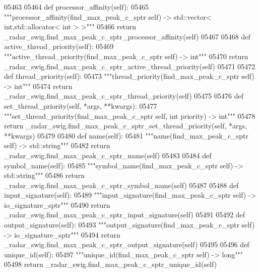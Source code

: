 \begin{DoxyCode}
{{{{{{{{{{{{{{{{{{05463 
05464     \textcolor{keyword}{def }processor_affinity(self):
05465         \textcolor{stringliteral}{"""processor\_affinity(find\_max\_peak\_c\_sptr self) -> std::vector< int,std::allocator< int > >"""}
05466         \textcolor{keywordflow}{return} \_radar\_swig.find\_max\_peak\_c\_sptr\_processor\_affinity(self)
05467 
05468     \textcolor{keyword}{def }active_thread_priority(self):
05469         \textcolor{stringliteral}{"""active\_thread\_priority(find\_max\_peak\_c\_sptr self) -> int"""}
05470         \textcolor{keywordflow}{return} \_radar\_swig.find\_max\_peak\_c\_sptr\_active\_thread\_priority(self)
05471 
05472     \textcolor{keyword}{def }thread_priority(self):
05473         \textcolor{stringliteral}{"""thread\_priority(find\_max\_peak\_c\_sptr self) -> int"""}
05474         \textcolor{keywordflow}{return} \_radar\_swig.find\_max\_peak\_c\_sptr\_thread\_priority(self)
05475 
05476     \textcolor{keyword}{def }set_thread_priority(self, *args, **kwargs):
05477         \textcolor{stringliteral}{"""set\_thread\_priority(find\_max\_peak\_c\_sptr self, int priority) -> int"""}
05478         \textcolor{keywordflow}{return} \_radar\_swig.find\_max\_peak\_c\_sptr\_set\_thread\_priority(self, *args, **kwargs)
05479 
05480     \textcolor{keyword}{def }name(self):
05481         \textcolor{stringliteral}{"""name(find\_max\_peak\_c\_sptr self) -> std::string"""}
05482         \textcolor{keywordflow}{return} \_radar\_swig.find\_max\_peak\_c\_sptr\_name(self)
05483 
05484     \textcolor{keyword}{def }symbol_name(self):
05485         \textcolor{stringliteral}{"""symbol\_name(find\_max\_peak\_c\_sptr self) -> std::string"""}
05486         \textcolor{keywordflow}{return} \_radar\_swig.find\_max\_peak\_c\_sptr\_symbol\_name(self)
05487 
05488     \textcolor{keyword}{def }input_signature(self):
05489         \textcolor{stringliteral}{"""input\_signature(find\_max\_peak\_c\_sptr self) -> io\_signature\_sptr"""}
05490         \textcolor{keywordflow}{return} \_radar\_swig.find\_max\_peak\_c\_sptr\_input\_signature(self)
05491 
05492     \textcolor{keyword}{def }output_signature(self):
05493         \textcolor{stringliteral}{"""output\_signature(find\_max\_peak\_c\_sptr self) -> io\_signature\_sptr"""}
05494         \textcolor{keywordflow}{return} \_radar\_swig.find\_max\_peak\_c\_sptr\_output\_signature(self)
05495 
05496     \textcolor{keyword}{def }unique_id(self):
05497         \textcolor{stringliteral}{"""unique\_id(find\_max\_peak\_c\_sptr self) -> long"""}
05498         \textcolor{keywordflow}{return} \_radar\_swig.find\_max\_peak\_c\_sptr\_unique\_id(self)
}}}}}}}}}}}}}}}}}}
\end{DoxyCode}
